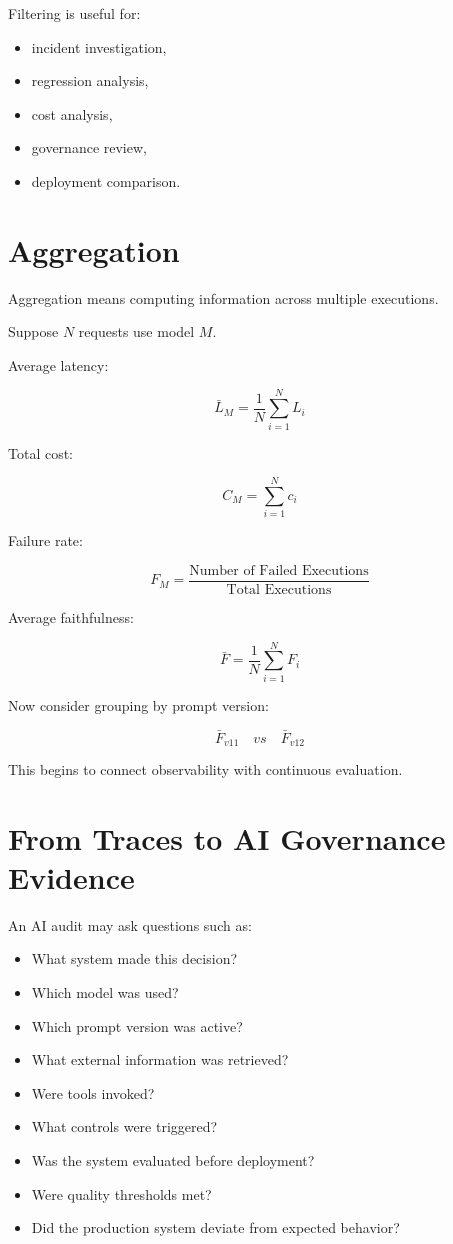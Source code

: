 \documentclass[11pt,a4paper]{article}
\begin{document}
Filtering is useful for:

\begin{itemize}
\item incident investigation,
\item regression analysis,
\item cost analysis,
\item governance review,
\item deployment comparison.
\end{itemize}

\section{Aggregation}

Aggregation means computing information across multiple executions.

Suppose $N$ requests use model $M$.

Average latency:

\[
\bar{L}_M = \frac{1}{N} \sum_{i=1}^{N} L_i
\]

Total cost:

\[
C_M = \sum_{i=1}^{N} c_i
\]

Failure rate:

\[
F_M = \frac{\text{Number of Failed Executions}}{\text{Total Executions}}
\]

Average faithfulness:

\[
\bar{F} = \frac{1}{N} \sum_{i=1}^{N} F_i
\]

Now consider grouping by prompt version:

\[
\bar{F}_{v11} \quad vs \quad \bar{F}_{v12}
\]

This begins to connect observability with continuous evaluation.

\section{From Traces to AI Governance Evidence}

An AI audit may ask questions such as:

\begin{itemize}
\item What system made this decision?
\item Which model was used?
\item Which prompt version was active?
\item What external information was retrieved?
\item Were tools invoked?
\item What controls were triggered?
\item Was the system evaluated before deployment?
\item Were quality thresholds met?
\item Did the production system deviate from expected behavior?
\end{itemize}
\end{document}
